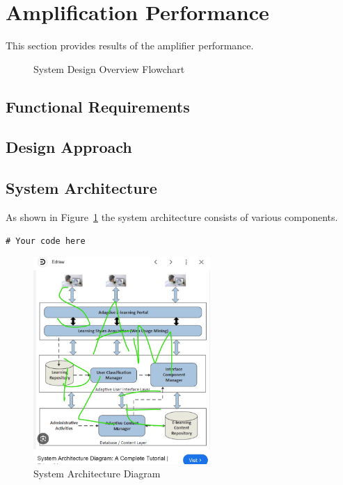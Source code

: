 \section{Amplification Performance}
This section provides results of the amplifier performance.

\begin{figure}[H]
    \centering
    \scalebox{0.5}{ %
        
    }
    \caption{System Design Overview Flowchart}
    \label{fig:decriptiveLabel1} %
\end{figure}

\subsection{Functional Requirements}

\subsection{Design Approach}

\subsection{System Architecture}
As shown in Figure~\ref{fig:decriptiveLabel1} the system architecture consists of various components.

\begin{lstlisting}[style=cstyle, caption=System Architecture Code Example, label=lst:SystemArchitecture6]
# Your code here
\end{lstlisting}

\begin{figure}[htbp] %
    \centering
    \includegraphics[width=0.6\textwidth]{figures/results/system_architecture.jpg}
    \caption{System Architecture Diagram}
    \label{fig:system-architecture20}
\end{figure}